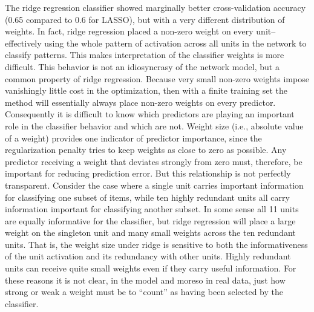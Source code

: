 The ridge regression classifier showed marginally better cross-validation accuracy (0.65 compared to 0.6 for LASSO), but with a very different distribution of weights. In fact, ridge regression placed a non-zero weight on every unit--effectively using the whole pattern of activation across all units in the network to classify patterns. This makes interpretation of the classifier weights is more difficult. This behavior is not an idiosyncrasy of the network model, but a common property of ridge regression. Because very small non-zero weights impose vanishingly little cost in the optimization, then with a finite training set the method will essentially always place non-zero weights on every predictor. Consequently it is difficult to know which predictors are playing an important role in the classifier behavior and which are not. Weight size (i.e., absolute value of a weight) provides one indicator of predictor importance, since the regularization penalty tries to keep weights as close to zero as possible. Any predictor receiving a weight that deviates strongly from zero must, therefore, be important for reducing prediction error. But this relationship is not perfectly transparent. Consider the case where a single unit carries important information for classifying one subset of items, while ten highly redundant units all carry information important for classifying another subset. In some sense all 11 units are equally informative for the classifier, but ridge regression will place a large weight on the singleton unit and many small weights across the ten redundant units. That is, the weight size under ridge is sensitive to both the informativeness of the unit activation and its redundancy with other units. Highly redundant units can receive quite small weights even if they carry useful information. For these reasons it is not clear, in the model and moreso in real data, just how strong or weak a weight must be to ``count'' as having been selected by the classifier. 

